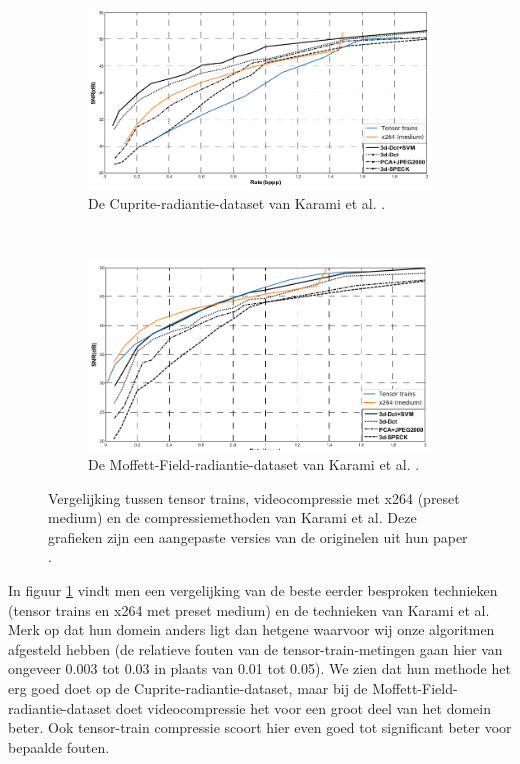 \begin{figure}[H]
\begin{subfigure}{\textwidth}
  \centering
  \includegraphics[width=0.9\linewidth]{images/karami_edited_cuprite.png}
  \caption{De Cuprite-radiantie-dataset van Karami et al. \cite{ref:aviris_standard}.}
\end{subfigure}
\\
\begin{subfigure}{\textwidth}
  \centering
  \includegraphics[width=0.9\linewidth]{images/karami_edited_moffet_field.png}
  \caption{De Moffett-Field-radiantie-dataset van Karami et al. \cite{ref:aviris_standard}.}
\end{subfigure}
\caption{Vergelijking tussen tensor trains, videocompressie met x264 (preset medium) en de compressiemethoden van Karami et al. Deze grafieken zijn een aangepaste versies van de originelen uit hun paper \cite{ref:karami}.}
\label{fig:literature-comparison}
\end{figure}

\newpage
In figuur \ref{fig:literature-comparison} vindt men een vergelijking van de beste eerder besproken technieken (tensor trains en x264 met preset medium) en de technieken van Karami et al. Merk op dat hun domein anders ligt dan hetgene waarvoor wij onze algoritmen afgesteld hebben (de relatieve fouten van de tensor-train-metingen gaan hier van ongeveer 0.003 tot 0.03 in plaats van 0.01 tot 0.05). We zien dat hun methode het erg goed doet op de Cuprite-radiantie-dataset, maar bij de Moffett-Field-radiantie-dataset doet videocompressie het voor een groot deel van het domein beter. Ook tensor-train compressie scoort hier even goed tot significant beter voor bepaalde fouten.


